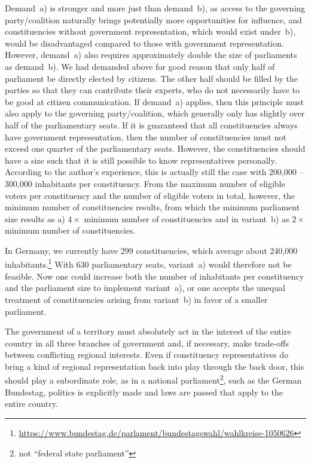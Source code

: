 Demand~a) is stronger and more just than demand~b), as access to the
governing party/coalition naturally brings potentially more opportunities for influence, and
constituencies without government representation, which would exist under~b), would be
disadvantaged compared to those with government representation. However, demand~a) also requires approximately double the
size of parliaments as demand~b).
We had demanded above for good reason that only half of parliament be directly
elected by citizens. The other half should be filled by the parties so that they can
contribute their experts, who do not necessarily have to be good at citizen communication. If
demand~a) applies, then this principle must also apply to the governing party/coalition,
which generally only has slightly over half of the parliamentary seats. If it is guaranteed that all
constituencies always have government representation, then the number of constituencies must not
exceed one quarter of the parliamentary seats. However, the constituencies should have a size
such that it is still possible to know representatives personally. According to the author's
experience, this is actually still the case with 200,000 -- 300,000 inhabitants per constituency.
From the maximum number of eligible voters per constituency and the number of
eligible voters in total, however, the minimum number of constituencies results, from which
the minimum parliament size results as a) $4\times$ minimum number of constituencies and in
variant~b) as $2\times$ minimum number of constituencies.

In Germany, we currently have 299 constituencies, which average about 240,000 inhabitants.\footnote{\url{https://www.bundestag.de/parlament/bundestagswahl/wahlkreise-1050626}} With
630 parliamentary seats, variant~a) would therefore not be feasible. Now one could increase both the
number of inhabitants per constituency and the parliament size to implement variant~a),
or one accepts the unequal treatment of constituencies arising from variant~b)
in favor of a smaller parliament.

The government of a territory must absolutely act in the interest of the entire
country in all three branches of government and, if necessary, make trade-offs between conflicting regional interests.
Even if constituency representatives do bring a kind of regional representation back into play through the back door,
this should play a subordinate role, as
in a national parliament\footnote{not \enquote{federal state parliament}}, such as the German
Bundestag, politics is explicitly made and laws are passed that apply to the entire country.

